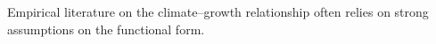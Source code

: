 \documentclass[preview]{standalone}
\begin{document}
Empirical literature on the climate–growth relationship often relies on strong assumptions on the functional form.\\
\end{document}
